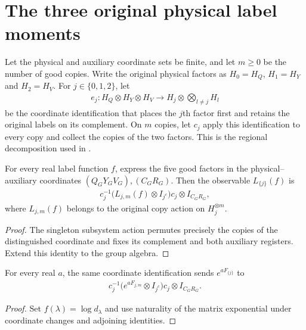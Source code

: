 \section{The three original physical label moments}
\label{sec:replica_good_configuration_singleton_moment}

\begin{definition}
\label{def:physical_singleton_equiv}
Let the physical and auxiliary coordinate sets be finite, and let $m\geq0$ be the number of good copies.
Write the original physical factors as $H_0=H_Q$, $H_1=H_Y$ and
$H_2=H_V$. For $j\in\{0,1,2\}$, let
\begin{align*}
 e_j:H_Q\otimes H_Y\otimes H_V
 \longrightarrow H_j\otimes\bigotimes_{l\ne j}H_l
\end{align*}
be the coordinate identification that places the $j$th factor first
and retains the original labels on its complement. On $m$ copies,
let $c_j$ apply this identification to every copy and collect the
copies of the two factors. This is the regional decomposition used in
\cite[Section~8, lines~550--560]{OpenAI2026AreaLaw}.
\end{definition}

\begin{theorem}
\label{thm:five_factor_singleton_label_observable}
For every real label function $f$, express the five good factors in
the physical--auxiliary coordinates
$(Q_GY_GV_G),(C_GR_G)$. Then the observable $L_{\{j\}}(f)$ is
\begin{align*}
 c_j^{-1}\bigl(L_{j,m}(f)\otimes I_{j^c}\bigr)c_j
 \otimes I_{C_GR_G},
\end{align*}
where $L_{j,m}(f)$ belongs to the original copy action on $H_j^{\otimes m}$.
\end{theorem}
\begin{proof}
The singleton subsystem action permutes precisely the copies of
the distinguished coordinate and fixes its complement and both
auxiliary registers. Extend this identity to the group algebra.
\end{proof}

\begin{theorem}
\label{thm:five_factor_singleton_label_exponential}
For every real $a$, the same coordinate identification sends
$e^{aF_{\{j\}}}$ to
\begin{align*}
 c_j^{-1}\bigl(e^{aF_{j,m}}\otimes I_{j^c}\bigr)c_j
 \otimes I_{C_GR_G}.
\end{align*}
\end{theorem}
\begin{proof}
Set $f(\lambda)=\log d_\lambda$ and use naturality of the matrix
exponential under coordinate changes and adjoining identities.
\end{proof}

